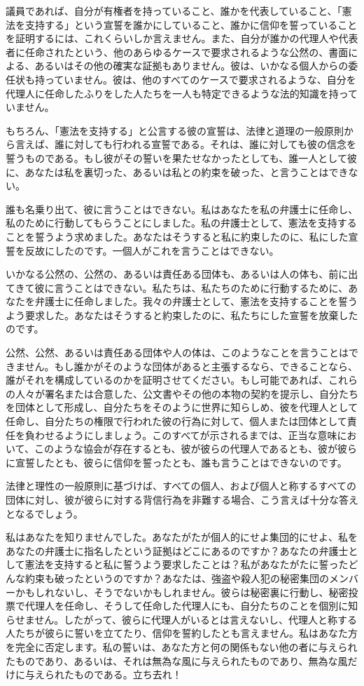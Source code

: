 \documentclass[dvipdfmx, uplatex, tate, landscape]{utbook}
\begin{document}
議員であれば、自分が有権者を持っていること、誰かを代表していること、「憲法を支持する」という宣誓を誰かにしていること、誰かに信仰を誓っていることを証明するには、これくらいしか言えません。また、自分が誰かの代理人や代表者に任命されたという、他のあらゆるケースで要求されるような公然の、書面による、あるいはその他の確実な証拠もありません。彼は、いかなる個人からの委任状も持っていません。彼は、他のすべてのケースで要求されるような、自分を代理人に任命したふりをした人たちを一人も特定できるような法的知識を持っていません。

もちろん、「憲法を支持する」と公言する彼の宣誓は、法律と道理の一般原則から言えば、誰に対しても行われる宣誓である。それは、誰に対しても彼の信念を誓うものである。もし彼がその誓いを果たせなかったとしても、誰一人として彼に、あなたは私を裏切った、あるいは私との約束を破った、と言うことはできない。

誰も名乗り出て、彼に言うことはできない。私はあなたを私の弁護士に任命し、私のために行動してもらうことにしました。私の弁護士として、憲法を支持することを誓うよう求めました。あなたはそうすると私に約束したのに、私にした宣誓を反故にしたのです。一個人がこれを言うことはできない。

いかなる公然の、公然の、あるいは責任ある団体も、あるいは人の体も、前に出てきて彼に言うことはできない。私たちは、私たちのために行動するために、あなたを弁護士に任命しました。我々の弁護士として、憲法を支持することを誓うよう要求した。あなたはそうすると約束したのに、私たちにした宣誓を放棄したのです。

公然、公然、あるいは責任ある団体や人の体は、このようなことを言うことはできません。もし誰かがそのような団体があると主張するなら、できることなら、誰がそれを構成しているのかを証明させてください。もし可能であれば、これらの人々が署名または合意した、公文書やその他の本物の契約を提示し、自分たちを団体として形成し、自分たちをそのように世界に知らしめ、彼を代理人として任命し、自分たちの権限で行われた彼の行為に対して、個人または団体として責任を負わせるようにしましょう。このすべてが示されるまでは、正当な意味において、このような協会が存在するとも、彼が彼らの代理人であるとも、彼が彼らに宣誓したとも、彼らに信仰を誓ったとも、誰も言うことはできないのです。

法律と理性の一般原則に基づけば、すべての個人、および個人と称するすべての団体に対し、彼が彼らに対する背信行為を非難する場合、こう言えば十分な答えとなるでしょう。

私はあなたを知りませんでした。あなたがたが個人的にせよ集団的にせよ、私をあなたの弁護士に指名したという証拠はどこにあるのですか？あなたの弁護士として憲法を支持すると私に誓うよう要求したことは？私があなたがたに誓ったどんな約束も破ったというのですか？あなたは、強盗や殺人犯の秘密集団のメンバーかもしれないし、そうでないかもしれません。彼らは秘密裏に行動し、秘密投票で代理人を任命し、そうして任命した代理人にも、自分たちのことを個別に知らせません。したがって、彼らに代理人がいるとは言えないし、代理人と称する人たちが彼らに誓いを立てたり、信仰を誓約したとも言えません。私はあなた方を完全に否定します。私の誓いは、あなた方と何の関係もない他の者に与えられたものであり、あるいは、それは無為な風に与えられたものであり、無為な風だけに与えられたものである。立ち去れ！
\end{document}
